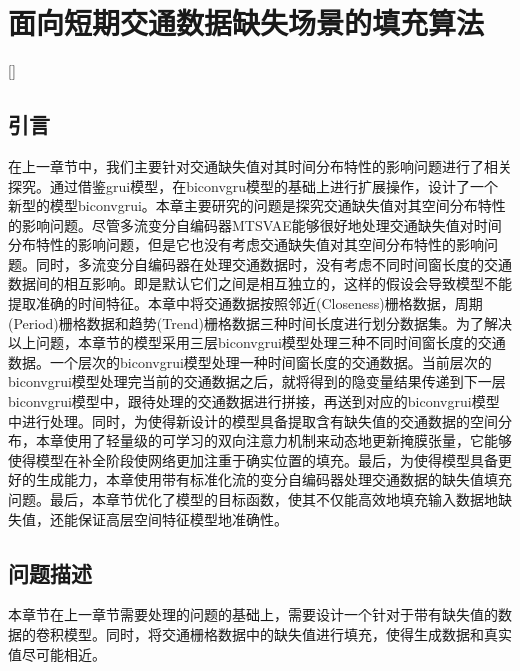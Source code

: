 
\chapter[面向短期交通数据缺失场景的填充算法]{面向短期交通数据缺失场景的填充算法}[]
\section{引言}
在上一章节中，我们主要针对交通缺失值对其时间分布特性的影响问题进行了相关探究。通过借鉴grui模型，在biconvgru模型的基础上进行扩展操作，设计了一个新型的模型biconvgrui。本章主要研究的问题是探究交通缺失值对其空间分布特性的影响问题。尽管多流变分自编码器MTSVAE能够很好地处理交通缺失值对时间分布特性的影响问题，但是它也没有考虑交通缺失值对其空间分布特性的影响问题。同时，多流变分自编码器在处理交通数据时，没有考虑不同时间窗长度的交通数据间的相互影响。即是默认它们之间是相互独立的，这样的假设会导致模型不能提取准确的时间特征。本章中将交通数据按照邻近(Closeness)栅格数据，周期(Period)栅格数据和趋势(Trend)栅格数据三种时间长度进行划分数据集。为了解决以上问题，本章节的模型采用三层biconvgrui模型处理三种不同时间窗长度的交通数据。一个层次的biconvgrui模型处理一种时间窗长度的交通数据。当前层次的biconvgrui模型处理完当前的交通数据之后，就将得到的隐变量结果传递到下一层biconvgrui模型中，跟待处理的交通数据进行拼接，再送到对应的biconvgrui模型中进行处理。同时，为使得新设计的模型具备提取含有缺失值的交通数据的空间分布，本章使用了轻量级的可学习的双向注意力机制来动态地更新掩膜张量，它能够使得模型在补全阶段使网络更加注重于确实位置的填充。最后，为使得模型具备更好的生成能力，本章使用带有标准化流的变分自编码器处理交通数据的缺失值填充问题。最后，本章节优化了模型的目标函数，使其不仅能高效地填充输入数据地缺失值，还能保证高层空间特征模型地准确性。


\section{问题描述} \label{sec4_2}
本章节在上一章节需要处理的问题的基础上，需要设计一个针对于带有缺失值的数据的卷积模型。同时，将交通栅格数据中的缺失值进行填充，使得生成数据和真实值尽可能相近。
